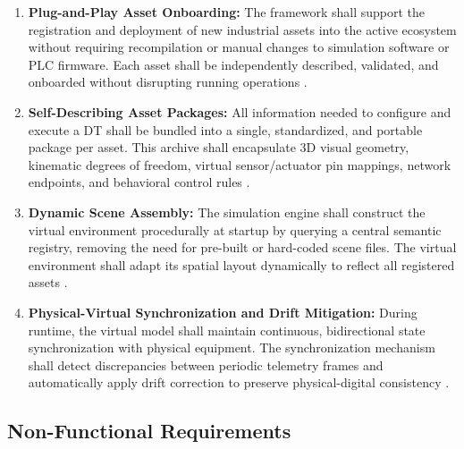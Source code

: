 \begin{enumerate}
    \item[\textbf{FR1}] \textbf{Plug-and-Play Asset Onboarding:} The framework shall support the registration and deployment of new industrial assets into the active ecosystem without requiring recompilation or manual changes to simulation software or \gls{PLC} firmware. Each asset shall be independently described, validated, and onboarded without disrupting running operations \cite{Rocha2024,AshtariTalkhestani2019}.

    \item[\textbf{FR2}] \textbf{Self-Describing Asset Packages:} All information needed to configure and execute a \gls{DT} shall be bundled into a single, standardized, and portable package per asset. This archive shall encapsulate 3D visual geometry, kinematic degrees of freedom, virtual sensor/actuator pin mappings, network endpoints, and behavioral control rules \cite{Lu2025,Gollner2022}.

    \item[\textbf{FR3}] \textbf{Dynamic Scene Assembly:} The simulation engine shall construct the virtual environment procedurally at startup by querying a central semantic registry, removing the need for pre-built or hard-coded scene files. The virtual environment shall adapt its spatial layout dynamically to reflect all registered assets \cite{Alexopoulos2025}.

    \item[\textbf{FR4}] \textbf{Physical-Virtual Synchronization and Drift Mitigation:} During runtime, the virtual model shall maintain continuous, bidirectional state synchronization with physical equipment. The synchronization mechanism shall detect discrepancies between periodic telemetry frames and automatically apply drift correction to preserve physical-digital consistency \cite{Kritzinger2018,Tao2019}.
\end{enumerate}

\subsection{Non-Functional Requirements}

